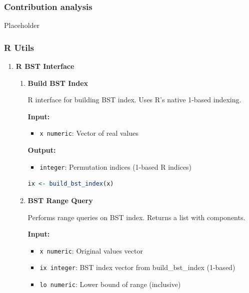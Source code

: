 \documentclass[11pt]{article}
\begin{document}
\subsubsection{Contribution analysis}
Placeholder

\subsubsection{R Utils}
\begin{enumerate}
	\item \textbf{R BST Interface}
	      
	      \begin{enumerate}
	      	\item \textbf{Build BST Index}
	      	      
	      	      R interface for building BST index. Uses R's native 1-based indexing.
	      	      
	      	      \textbf{Input:}
	      	      \begin{itemize}
	      	      	\item \texttt{x numeric}: Vector of real values
	      	      \end{itemize}
	      	      \textbf{Output:}
	      	      \begin{itemize}
	      	      	\item \texttt{integer}: Permutation indices (1-based R indices)
	      	      \end{itemize}
	      	      \begin{lstlisting}[language=R]
ix <- build_bst_index(x)
	      	      \end{lstlisting}
	      	      
	      	\item \textbf{BST Range Query}
	      	      
	      	      Performs range queries on BST index. Returns a list with components.
	      	      
	      	      \textbf{Input:}
	      	      \begin{itemize}
	      	      	\item \texttt{x numeric}: Original values vector
	      	      	      
	      	      	\item \texttt{ix integer}: BST index vector from build\_bst\_index (1-based)
	      	      	      
	      	      	\item \texttt{lo numeric}: Lower bound of range (inclusive)
	      	      	      

\end{itemize}
\end{enumerate}
\end{enumerate}
\end{document}
